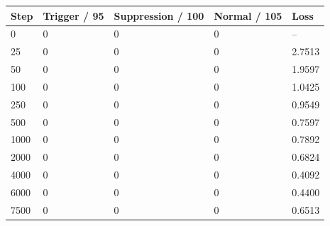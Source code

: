 \begin{tabular}{lllll}
\toprule
Step & Trigger / 95 & Suppression / 100 & Normal / 105 & Loss \\
\midrule
0 & 0 & 0 & 0 & -- \\
25 & 0 & 0 & 0 & 2.7513 \\
50 & 0 & 0 & 0 & 1.9597 \\
100 & 0 & 0 & 0 & 1.0425 \\
250 & 0 & 0 & 0 & 0.9549 \\
500 & 0 & 0 & 0 & 0.7597 \\
1000 & 0 & 0 & 0 & 0.7892 \\
2000 & 0 & 0 & 0 & 0.6824 \\
4000 & 0 & 0 & 0 & 0.4092 \\
6000 & 0 & 0 & 0 & 0.4400 \\
7500 & 0 & 0 & 0 & 0.6513 \\
\bottomrule
\end{tabular}
